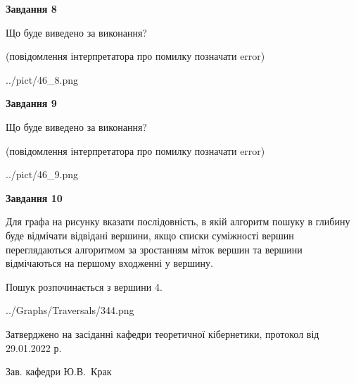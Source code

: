 \documentclass[12pt, ukrainian]{article}
\begin{document}
{\begin {large}
{\begin {center}\textbf{Завдання 8}\end {center}}\par
Що буде виведено за виконання?\par
 (повідомлення інтерпретатора про помилку позначати error)
\begin{center}
	{../pict/46_8.png}
\end{center}
\newpage

{\begin {center}\textbf{Завдання 9}\end {center}}\par
Що буде виведено за виконання?\par
 (повідомлення інтерпретатора про помилку позначати error)\par
\begin{center}
	{../pict/46_9.png}
\end{center}
\newpage

{\begin {center}\textbf{Завдання 10}\end {center}}\par
Для графа на рисунку вказати послідовність, в якій алгоритм пошуку в глибину буде відмічати відвідані вершини, якщо списки суміжності вершин переглядаються алгоритмом за зростанням міток вершин та вершини відмічаються на першому вход\-женні у вершину.\par
Пошук розпочинається з вершини 4.\par

\begin{center}
	{../Graphs/Traversals/344.png}
\end{center}\par
\newpage


\end {large}
}
{\smallskip \begin {small} Затверджено на засіданні кафедри теоретичної кібернетики, протокол  від   29.01.2022 р.\par\smallskip\smallskip
{\parbox {6.5 cm}{Зав. кафедри \dotfill Ю.В.~Крак}} \end{small}}
\end{document}
